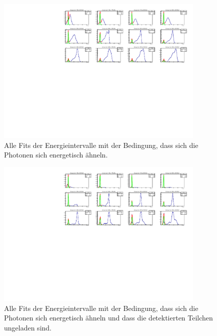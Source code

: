\documentclass[a4paper,11pt,oneside,final,german,openbib,pdftex]{scrbook}
\begin{document}
{\begin{appendix}

\begin{figure}[h!]
	\begin{center}
		\includegraphics[width=100mm]{NewCalib/Strahlzeit2014/20171904RealIntervalAllFits}
		\caption[Strahlzeit: Symmetrische Photonen alle Fits mit Hintergrund]{Alle Fits der Energieintervalle mit der Bedingung, dass sich die Photonen sich energetisch ähneln.}
		\label{fig:similarenergyallfits}
	\end{center}
\end{figure}

\begin{figure}[h!]
	\begin{center}
		\includegraphics[width=100mm]{NewCalib/Strahlzeit2014/20171904RealUnchargedAllFits}
		\caption[Strahlzeit: Alle Fits keine weiteren Bedingungen]{Alle Fits der Energieintervalle mit der Bedingung, dass sich die Photonen sich energetisch ähneln und dass die detektierten Teilchen ungeladen sind.}
		\label{fig:similarenergyallfitsuncharged}
	\end{center}
\end{figure}


\end{appendix}}
\end{document}

